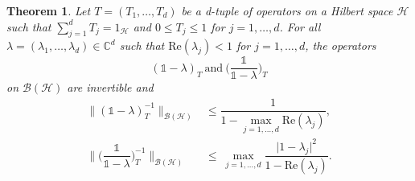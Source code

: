 \documentclass[11pt, reqno]{amsart}
\newtheorem{theorem}{Theorem}[section]
\newcommand\1{\boldsymbol {1}}
\numberwithin{equation}{section}
\begin{document}
\begin{theorem}\label{invertibleoperatorsforlambda}
Let $T=(T_{1},\hdots, T_{d})$ be a d-tuple of operators on a Hilbert space $\mathcal{H}$ such that $\sum_{j=1}^{d}T_{j}=1_{\mathcal{H}}$ and $0\leq T_{j}\leq 1$ for $j=1,\hdots, d$. For all $\lambda=(\lambda_{1},\hdots,\lambda_{d})\in\mathbb{C}^{d}$ such that $\mathrm{Re}(\lambda_{j})<1$ for $j=1,\hdots,d$, the operators 
$$(\mathds{1}-\lambda)_{T}~\text{and}~\bigg(\dfrac{\mathds{1}}{\mathds{1}-\lambda}\bigg)_{T}$$
on $\mathcal{B(H)}$ are invertible and
\begin{align}
\Big\| (\mathds{1}-\lambda)_{T}^{-1} \Big\|_{\mathcal{B(H)}} & \leq \dfrac{1}{1-\underset{j=1,\hdots, d}{\max}\mathrm{Re}(\lambda_{j})},\label{boundlabelforlambdax} \\
\Bigg\| \bigg(\dfrac{\mathds{1}}{\mathds{1}-\lambda}\bigg)_{T}^{-1} \Bigg\|_{\mathcal{B(H)}} &\leq ~ \max_{j=1,\hdots,d}\dfrac{\lvert 1- \lambda_{j} \rvert^{2}}{1-\mathrm{Re}(\lambda_{j})}.\label{boundlabelforlambdax2}
\end{align}
\end{theorem}
\end{document}
